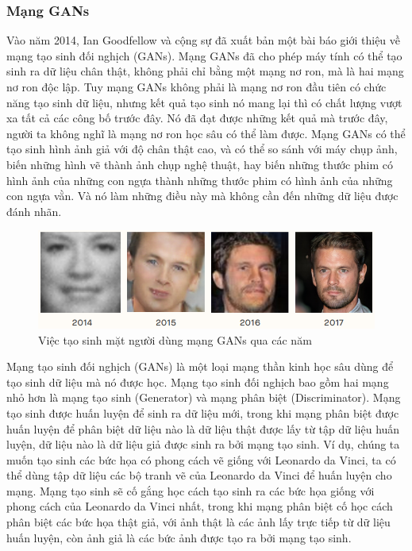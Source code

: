 \subsubsection{Mạng GANs}
Vào năm 2014, Ian Goodfellow và cộng sự đã xuất bản một bài báo \cite{gans_base} giới thiệu về mạng tạo sinh đối nghịch (GANs). Mạng GANs đã cho phép máy tính có thể tạo sinh ra dữ liệu chân thật, không phải chỉ bằng một mạng nơ ron, mà là hai mạng nơ ron độc lập. Tuy mạng GANs không phải là mạng nơ ron đầu tiên có chức năng tạo sinh dữ liệu, nhưng kết quả tạo sinh nó mang lại thì có chất lượng vượt xa tất cả các công bố trước đây. Nó đã đạt được những kết quả mà trước đây, người ta không nghĩ là mạng nơ ron học sâu có thể làm được. Mạng GANs có thể tạo sinh hình ảnh giả với độ chân thật cao, và có thể so sánh với máy chụp ảnh, biến những hình vẽ thành ảnh chụp nghệ thuật, hay biến những thước phim có hình ảnh của những con ngựa thành những thước phim có hình ảnh của những con ngựa vằn. Và nó làm những điều này mà không cần đến những dữ liệu được đánh nhãn.

\begin{figure}[H]
    \centering
    \includegraphics[width=15cm]{./content/materials/gans-faces.png}
    \caption{Việc tạo sinh mặt người dùng mạng GANs qua các năm \cite{gans_faces}}
\end{figure}

Mạng tạo sinh đối nghịch (GANs) là một loại mạng thần kinh học sâu dùng để tạo sinh dữ liệu mà nó được học. Mạng tạo sinh đối nghịch bao gồm hai mạng nhỏ hơn là mạng tạo sinh (Generator) và mạng phân biệt (Discriminator). Mạng tạo sinh được huấn luyện để sinh ra dữ liệu mới, trong khi mạng phân biệt được huấn luyện để phân biệt dữ liệu nào là dữ liệu thật được lấy từ tập dữ liệu huấn luyện, dữ liệu nào là dữ liệu giả được sinh ra bởi mạng tạo sinh. Ví dụ, chúng ta muốn tạo sinh các bức họa có phong cách vẽ giống với Leonardo da Vinci, ta có thể dùng tập dữ liệu các bộ tranh vẽ của Leonardo da Vinci để huấn luyện cho mạng. Mạng tạo sinh sẽ cố gắng học cách tạo sinh ra các bức họa giống với phong cách của Leonardo da Vinci nhất, trong khi mạng phân biệt cố  học cách phân biệt các bức họa thật giả, với ảnh thật là các ảnh lấy trực tiếp từ dữ liệu huấn luyện, còn ảnh giả là các bức ảnh được tạo ra bởi mạng tạo sinh.

